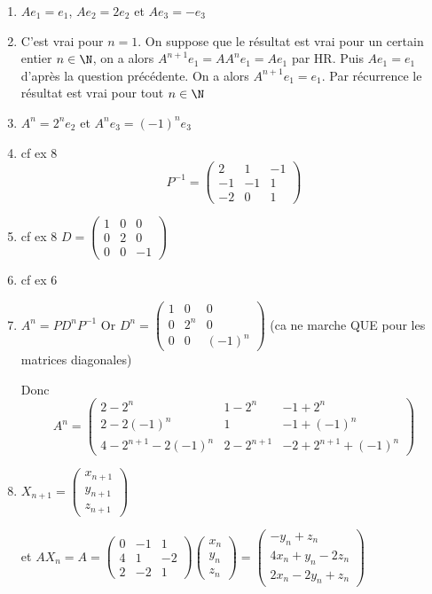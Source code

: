 \documentclass[a4paper, 11pt,reqno]{article}
\begin{document}
\begin{correction}
\begin{enumerate}
\item $Ae_1 = e_1$, $Ae_2 =2e_2$ et $Ae_3 =-e_3$

\item C'est vrai pour $n=1$. On suppose que le résultat est vrai pour un certain entier $n\in \N$, on a alors $A^{n+1} e_1 =A A^ne_1=Ae_1$ par HR. Puis $Ae_1=e_1$ d'après la question précédente. On a alors $A^{n+1}e_1 =e_1$. Par récurrence le résultat est vrai pour tout $n\in \N$

\item $A^n=2^ne_2$ et $A^n e_3 =(-1)^n e_3$

\item cf ex 8 $$P^{-1}= \left(
\begin{array}{ccc}
2&1&-1\\
-1&-1&1\\
-2&0&1
\end{array}
 \right)$$ 

\item cf ex 8 $D= \left(
\begin{array}{ccc}
1&0&0\\
0&2&0\\
0&0&-1
\end{array}
 \right)$ 
 \item cf ex 6
 \item $A^n = PD^n P^{-1}$ 
Or $D^n  =  \left(
\begin{array}{ccc}
1&0&0\\
0&2^n&0\\
0&0&(-1)^n
\end{array}
 \right)$  (ca ne marche QUE pour les matrices diagonales) 
 
 Donc 
 $$A^n = \left(
\begin{array}{ccc}
2-2^n&1-2^n&-1+2^n\\
2-2(-1)^n&1&-1+(-1)^n\\
4-2^{n+1} -2(-1)^n& 2-2^{n+1}&-2+2^{n+1}+(-1)^n
\end{array}
 \right)$$ 
 
 \item $X_{n+1} = \left(
\begin{array}{c}
x_{n+1}\\
y_{n+1}\\
z_{n+1}
\end{array}
 \right)$
 
 et $AX_n = A=\left(
\begin{array}{ccc}
0&-1&1\\
4&1&-2\\
2&-2&1
\end{array}
 \right)  \left(
\begin{array}{c}
x_{n}\\
y_{n}\\
z_{n}
\end{array}
 \right)=\left(
\begin{array}{c}
-y_n+z_{n}\\
4x_n +y_n -2z_{n}\\
2x_n-2y_n+z_{n}
\end{array}
 \right) $
 

\end{enumerate}
\end{correction}
\end{document}
